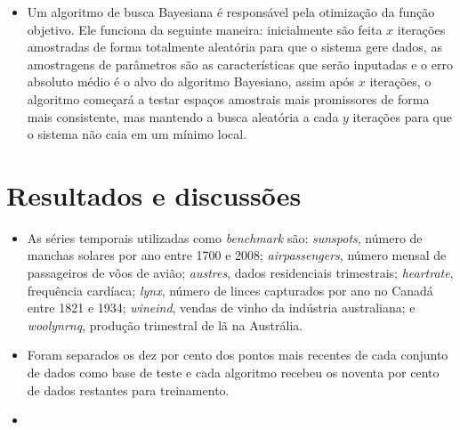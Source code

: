 \documentclass[portrait, 24pt, final]{sciposter}
\begin{document}
\begin{multicols}{2}
\begin{itemize}
\item
Um algoritmo de busca Bayesiana é responsável pela otimização da função objetivo. Ele funciona da seguinte maneira: inicialmente são feita $x$ iterações amostradas de forma totalmente aleatória para que o sistema gere dados, as amostragens de parâmetros são as características que serão inputadas e o erro absoluto médio é o alvo do algoritmo Bayesiano, assim após $x$ iterações, o algoritmo começará a testar espaços amostrais mais promissores de forma mais consistente, mas mantendo a busca aleatória a cada $y$ iterações para que o sistema não caia em um mínimo local.

\end{itemize} 

\vspace{6cm}

\section*{Resultados e discussões}

\begin{itemize}

\item

	As séries temporais utilizadas como \textit{benchmark} são: \textit{sunspots}, número de manchas solares por ano entre 1700 e 2008; \textit{airpassengers}, número mensal de passageiros de vôos de avião; \textit{austres}, dados residenciais trimestrais; \textit{heartrate}, frequência cardíaca; \textit{lynx}, número de linces capturados por ano no Canadá entre 1821 e 1934; \textit{wineind}, vendas de vinho da indústria australiana; e \textit{woolynrnq}, produção trimestral de lã na Austrália.

\item

	Foram separados os dez por cento dos pontos mais recentes de cada conjunto de dados como base de teste e cada algoritmo recebeu os noventa por cento de dados restantes para treinamento.

\item 


\end{itemize}
\end{multicols}
\end{document}
